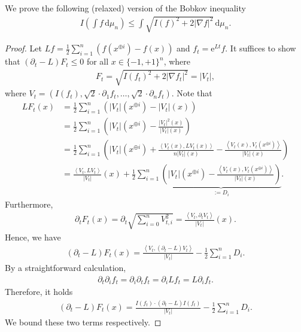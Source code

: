 \documentclass[11pt]{article}
\theoremstyle{plain}
\theoremstyle{definition}
\theoremstyle{remark}
\newcommand{\dif}{\,\mathrm{d}}
\newcommand{\e}{\mathrm{e}}
\newcommand{\tuple}[1]{\left(#1\right)}
\newcommand{\inner}[2]{\left\langle #1,#2\right\rangle}
\newcommand{\tp}{\tuple}
\newcommand{\abs}[1]{\left\vert#1\right\vert}
\begin{document}
We prove the following (relaxed) version of the Bobkov inequality
\begin{align*}
    I\tp{\int f \dif \mu_n} \le \int \sqrt{I(f)^2 + 2\abs{\nabla f}^2} \dif \mu_n.
\end{align*}
\begin{proof}
    Let $L f = \frac{1}{2} \sum_{i=1}^n \tp{f(x^{\oplus i}) - f(x)}$ and $f_t = \e^{Lt} f$.
    It suffices to show that $(\partial_t - L) F_t \le 0$ for all $x \in \{-1,+1\}^n$, where
    \begin{align*}
        F_t = \sqrt{I(f_t)^2 + 2 \abs{\nabla f_t}^2} = \abs{V_t},
    \end{align*}
    where $V_t = (I(f_t),\sqrt{2} \cdot \partial_1 f_t,\ldots,\sqrt{2} \cdot \partial_n f_t)$.
    Note that
    \begin{align*}
        L F_t(x) &= \frac{1}{2}\sum_{i=1}^n \tp{|V_t|(x^{\oplus i}) - |V_t|(x)}\\
        &= \frac{1}{2} \sum_{i=1}^n \tp{\abs{V_t}(x^{\oplus i}) - \frac{\abs{V_t}^2(x)}{\abs{V_t}(x)}}\\
        &= \frac{1}{2} \sum_{i=1}^n \tp{\abs{V_t}(x^{\oplus i}) + \frac{\inner{V_t(x)}{L V_t(x)}}{n \abs{V_t}(x)} - \frac{\inner{V_t(x)}{V_t(x^{\oplus i})}}{\abs{V_t}(x)}}\\
        &= \frac{\inner{V_t}{LV_t}}{\abs{V_t}}(x) + \frac{1}{2} \sum_{i=1}^n \underbrace{\tp{\abs{V_t}(x^{\oplus i}) - \frac{\inner{V_t(x)}{V_t(x^{\oplus i})} }{\abs{V_t}(x)}}}_{:=D_i}.
    \end{align*}
    Furthermore,
\begin{align*}
\partial_t F_t(x) = \partial_t \sqrt{\sum_{i=0}^n V_{t,i}^2} = \frac{\inner{V_{t}}{\partial_t V_t}}{\abs{V_t}}(x). 
\end{align*}
Hence, we have
\begin{align*}
    (\partial_t - L) F_t(x) = \frac{\inner{V_t}{(\partial_t - L)V_t}}{\abs{V_t}} - \frac{1}{2} \sum_{i=1}^n D_i.
\end{align*}
By a straightforward calculation,
\begin{align*}
    \partial_t \partial_i f_t = \partial_i \partial_t f_t = \partial_i L f_t = L \partial_i f_t.
\end{align*}
Therefore, it holds
\begin{align*}
    (\partial_t - L) F_t(x) = \frac{I(f_t) \cdot (\partial_t - L)I(f_t)}{\abs{V_t}} - \frac{1}{2} \sum_{i=1}^n D_i.
\end{align*}
We bound these two terms respectively.


\end{proof}
\end{document}
